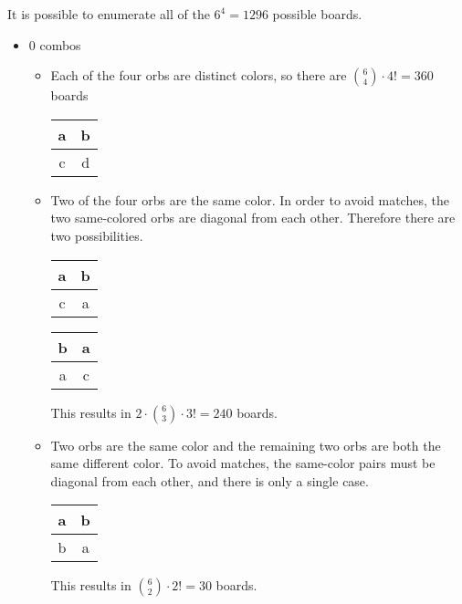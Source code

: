 \documentclass[12pt]{article}
\begin{document}
It is possible to enumerate all of the $6^4=1296$ possible boards.
\begin{itemize}
    \item 0 combos
    \begin{itemize}
        \item Each of the four orbs are distinct colors, so there are $\binom{6}{4}\cdot 4!=360$ boards
        \begin{center}
            \begin{tabular}{|c|c|}
            \hline
            a & b \\
            \hline
            c & d \\
            \hline
            \end{tabular}
        \end{center}
        \item Two of the four orbs are the same color. In order to avoid matches, the two same-colored orbs are diagonal from each other. Therefore there are two possibilities.
        \begin{center}
            \begin{tabular}{|c|c|}
            \hline
            a & b \\
            \hline
            c & a \\
            \hline
            \end{tabular}
            \qquad
            \begin{tabular}{|c|c|}
            \hline
            b & a \\
            \hline
            a & c \\
            \hline
            \end{tabular}
        \end{center}
        This results in $2\cdot\binom{6}{3}\cdot 3!=240$ boards.
        \item Two orbs are the same color and the remaining two orbs are both the same different color. To avoid matches, the same-color pairs must be diagonal from each other, and there is only a single case.
        \begin{center}
            \begin{tabular}{|c|c|}
            \hline
            a & b \\
            \hline
            b & a \\
            \hline
            \end{tabular}
        \end{center}
        This results in $\binom{6}{2}\cdot 2!=30$ boards.

\end{itemize}
\end{itemize}
\end{document}
